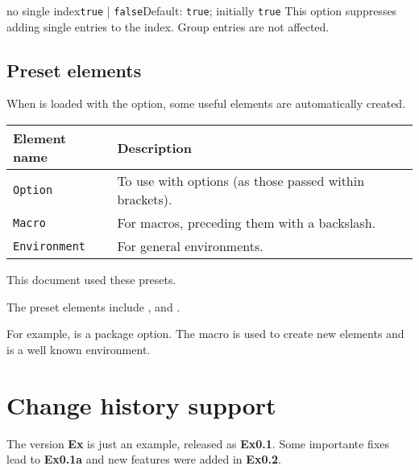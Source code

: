 \documentclass[11pt, outdir = ./out]{article}
\begin{document}
\begin{Optiondef}{no single index}{\texttt{true} | \texttt{false}}{Default: \texttt{true}; initially \texttt{true}}
    This option suppresses adding single entries to the index. Group entries are not affected.
\end{Optiondef}

\subsection{Preset elements}

When  is loaded with the  option, some useful elements are automatically created.

\bigskip
\begin{tabular}{ll}
    \textbf{Element name} & \textbf{Description}                                   \\
    \hline
    \texttt{Option}       & To use with options (as those passed within brackets). \\
    \texttt{Macro}        & For macros, preceding them with a backslash.           \\
    \texttt{Environment}  & For general environments.                              \\
\end{tabular}

\bigskip
This document used these presets.

\begin{DocsExample}
    The preset elements include ,  and .

    For example,  is a package option. The  macro is used to create new elements and  is a well known environment.
\end{DocsExample}


\section{Change history support}

\begin{latexcode}
\end{latexcode}

\begin{DocsExample}
    The version \textbf{Ex} is just an example, released as \textbf{Ex0.1}. Some importante fixes lead to \textbf{Ex0.1a} and new features were added in \textbf{Ex0.2}.
\end{DocsExample}
\end{document}
